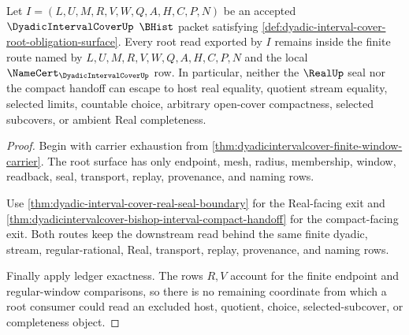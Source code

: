 \begin{theorem}
\label{thm:dyadic-interval-cover-root-nonescape}
Let $I=(L,U,M,R,V,W,Q,A,H,C,P,N)$ be an accepted $\DyadicIntervalCoverUp$ $\BHist$ packet satisfying \autoref{def:dyadic-interval-cover-root-obligation-surface}. Every root read exported by $I$ remains inside the finite route named by $L,U,M,R,V,W,Q,A,H,C,P,N$ and the local $\NameCert_{\DyadicIntervalCoverUp}$ row. In particular, neither the $\RealUp$ seal nor the compact handoff can escape to host real equality, quotient stream equality, selected limits, countable choice, arbitrary open-cover compactness, selected subcovers, or ambient Real completeness.
\end{theorem}
\begin{proof}
Begin with carrier exhaustion from \autoref{thm:dyadicintervalcover-finite-window-carrier}. The root surface has only endpoint, mesh, radius, membership, window, readback, seal, transport, replay, provenance, and naming rows.

Use \autoref{thm:dyadic-interval-cover-real-seal-boundary} for the Real-facing exit and \autoref{thm:dyadicintervalcover-bishop-interval-compact-handoff} for the compact-facing exit. Both routes keep the downstream read behind the same finite dyadic, stream, regular-rational, Real, transport, replay, provenance, and naming rows.

Finally apply ledger exactness. The rows $R,V$ account for the finite endpoint and regular-window comparisons, so there is no remaining coordinate from which a root consumer could read an excluded host, quotient, choice, selected-subcover, or completeness object.
\end{proof}

